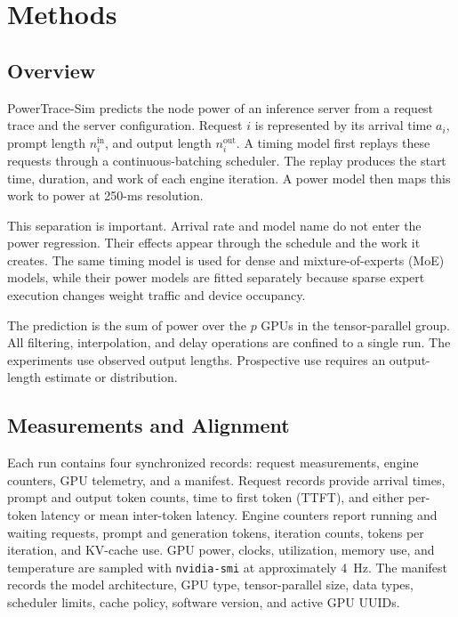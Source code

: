\section{Methods}
\label{sec:methods}

\subsection{Overview}

PowerTrace-Sim predicts the node power of an inference server from a request
trace and the server configuration.  Request $i$ is represented by its arrival
time $a_i$, prompt length $n_i^{\mathrm{in}}$, and output length
$n_i^{\mathrm{out}}$.  A timing model first replays these requests through a
continuous-batching scheduler.  The replay produces the start time, duration,
and work of each engine iteration.  A power model then maps this work to power
at 250-ms resolution.

This separation is important.  Arrival rate and model name do not enter the
power regression.  Their effects appear through the schedule and the work it
creates.  The same timing model is used for dense and mixture-of-experts (MoE)
models, while their power models are fitted separately because sparse expert
execution changes weight traffic and device occupancy.

The prediction is the sum of power over the $p$ GPUs in the tensor-parallel
group.  All filtering, interpolation, and delay operations are confined to a
single run.  The experiments use observed output lengths.  Prospective use
requires an output-length estimate or distribution.

\subsection{Measurements and Alignment}
\label{sec:power-alignment}

Each run contains four synchronized records: request measurements, engine
counters, GPU telemetry, and a manifest.  Request records provide arrival
times, prompt and output token counts, time to first token (TTFT), and either
per-token latency or mean inter-token latency.  Engine counters report running
and waiting requests, prompt and generation tokens, iteration counts, tokens
per iteration, and KV-cache use.  GPU power, clocks, utilization, memory use,
and temperature are sampled with \texttt{nvidia-smi} at approximately 4~Hz.
The manifest records the model architecture, GPU type, tensor-parallel size,
data types, scheduler limits, cache policy, software version, and active GPU
UUIDs.


